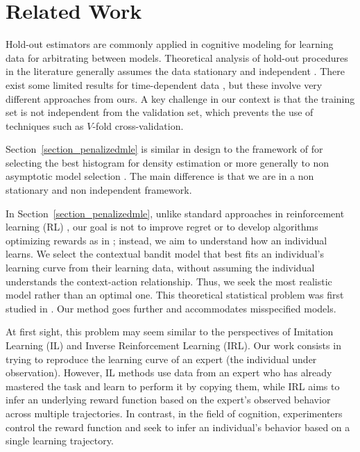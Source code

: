 \section{Related Work}
\label{section_relatedwork}

Hold-out estimators are commonly applied in cognitive modeling for learning data \citep{mezzadri2022hold,james2023strategy} for arbitrating between models. Theoretical analysis of hold-out procedures in the literature generally assumes the data stationary and independent \citep{massart2007concentration,arlot_lerasle,arlot2010survey}. There exist some limited results for time-dependent data \citep{Opsomer}, but these involve very different approaches from ours. A key challenge in our context is that the training set is not independent from the validation set, which prevents the use of %
techniques such as $V$-fold cross-validation.

Section~\ref{section_penalizedmle} is similar in design to the framework of  \citet{castellan} for selecting the best histogram for density estimation or more generally to non asymptotic model selection \citep{massart2007concentration}. The main difference is that we are in a non stationary and non independent framework. %

In Section~\ref{section_penalizedmle}, unlike standard approaches in reinforcement learning (RL) \citep{BubeckBianchi}, our goal is not to improve regret or to develop algorithms optimizing rewards as in \citep{dimakopoulou2017estimation,foster2019model,NEURIPS2020_751d5152}; instead, we aim to understand how an individual learns. We select the contextual bandit model that best fits an individual's learning curve from their learning data, without assuming the individual understands the context-action relationship. Thus, we seek the most realistic model rather than an optimal one. This theoretical statistical problem was first studied in \citep{aubert23}.%
Our method goes further and accommodates misspecified models.


At first sight, this problem may seem similar to the perspectives of Imitation Learning (IL) and Inverse Reinforcement Learning (IRL).
Our work consists in trying to reproduce the learning curve of an expert (the individual under observation).
However, IL methods use data from an expert who has already mastered the task \citep{hussein2017imitation} and learn to perform it by copying them, while IRL \citep{arora2021survey} aims to infer an underlying reward function based on the expert's observed behavior across multiple trajectories. In contrast, in the field of cognition, experimenters control the reward function and seek to infer an individual's behavior based on a single learning trajectory.


